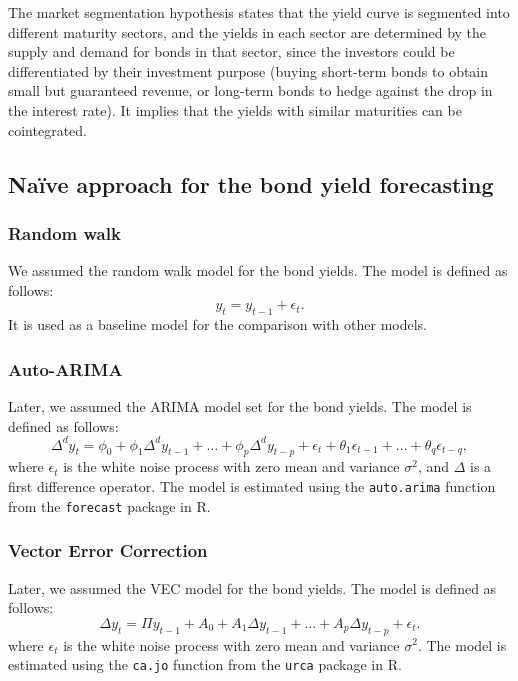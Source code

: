             The market segmentation hypothesis states that the yield curve is segmented into different maturity sectors, and the 
            yields in each sector are determined by the supply and demand for bonds in that sector, since the investors could be 
            differentiated by their investment purpose (buying short-term bonds to obtain small but guaranteed revenue, or long-term 
            bonds to hedge against the drop in the interest rate). It implies that the yields with similar maturities can be 
            cointegrated.




    \subsection{Na\"ive approach for the bond yield forecasting}
        \subsubsection{Random walk}
            We assumed the random walk model for the bond yields. The model is defined as follows:
            \begin{equation}\label{eq:RW}
                y_t = y_{t-1} + \epsilon_t.
            \end{equation}
            It is used as a baseline model for the comparison with other models.

        \subsubsection{Auto-ARIMA}
            Later, we assumed the ARIMA model set for the bond yields. The model is defined as follows:
            \begin{equation}\label{eq:ARIMA}
                \Delta^d y_t = \phi_0 + \phi_1 \Delta^d y_{t-1} + \ldots + \phi_p \Delta^d y_{t-p} + \epsilon_t + \theta_1 \epsilon_{t-1} + \ldots + \theta_q \epsilon_{t-q},
            \end{equation}
            where $\epsilon_t$ is the white noise process with zero mean and variance $\sigma^2$, and $\Delta$ is a first difference operator.
            The model is estimated using the \texttt{auto.arima} function from the \texttt{forecast} package in R.

        \subsubsection{Vector Error Correction}
            Later, we assumed the VEC model for the bond yields. The model is defined as follows:
            \begin{equation}\label{eq:VEC}
                \Delta y_{t} = \Pi y_{t-1} + A_0 + A_1 \Delta y_{t-1} + \dots + A_p \Delta y_{t-p} + \epsilon_t. 
            \end{equation}
            where $\epsilon_t$ is the white noise process with zero mean and variance $\sigma^2$.
            The model is estimated using the \texttt{ca.jo} function from the \texttt{urca} package in R.

